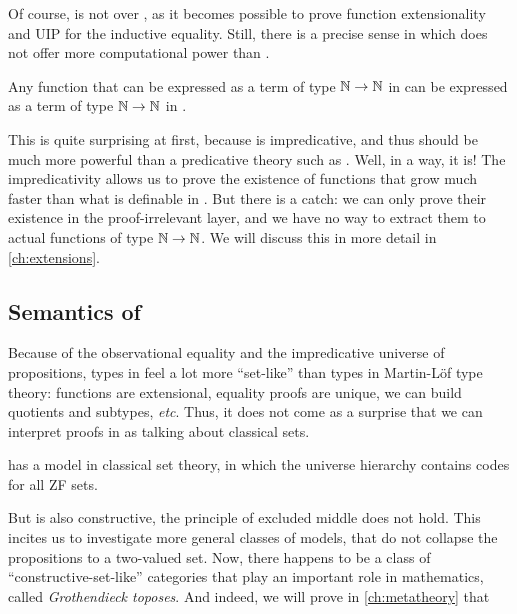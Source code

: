 Of course, \SetoidCC is not 
over \MLTT, as it becomes possible to prove function extensionality 
and UIP for the inductive equality.
% 
Still, there is a precise sense in which \SetoidCC does not offer more
computational power than \MLTT. 

\begin{theorem}
	Any function that can be expressed as a term of type \( \mathbb{N} \to \mathbb{N} \)
	in \SetoidCC can be expressed as a term of type \( \mathbb{N} \to \mathbb{N} \) in
	\MLTT.
\end{theorem}

This is quite surprising at first, because \SetoidCC is impredicative, and thus
should be much more powerful than a predicative theory such as \MLTT. 
% 
Well, in a way, it is! The impredicativity allows us to prove the existence
of functions that grow much faster than what is definable in \MLTT. But there is
a catch: we can only prove their existence in the proof-irrelevant layer, and
we have no way to extract them to actual functions of type \( \mathbb{N} \to \mathbb{N} \).
We will discuss this in more detail in \cref{ch:extensions}.

\subsection{Semantics of \SetoidCC}

Because of the observational equality and the impredicative universe of 
propositions, types in \SetoidCC feel a lot more ``set-like'' than types
in Martin-Löf type theory: functions are extensional, equality 
proofs are unique, we can build quotients and subtypes, \textit{etc}.
% 
Thus, it does not come as a surprise that we can interpret proofs in 
\SetoidCC as talking about classical sets.

\begin{theorem}
	\SetoidCC has a model in classical set theory, in which the universe
	hierarchy contains codes for all ZF sets.
\end{theorem}

But \SetoidCC is also constructive, \ie the principle of excluded middle
does not hold. 
% 
This incites us to investigate more general classes of models, that do not 
collapse the propositions to a two-valued set. Now, there happens to be a
class of ``constructive-set-like'' categories that play an important role
in mathematics, called \emph{Grothendieck toposes}. And indeed, we will
prove in \cref{ch:metatheory} that

